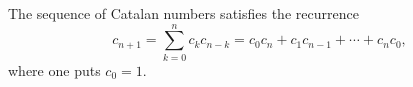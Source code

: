 \begin{thm}
The sequence of Catalan numbers satisfies the recurrence
\begin{equation}
\label{eqn:CatalanRecursion}
c_{n+1} = \sum_{k=0}^n c_k c_{n-k} = c_0c_n + c_1c_{n-1} + \cdots + c_nc_0,
\end{equation}
where one puts $c_0 = 1$.
\end{thm}